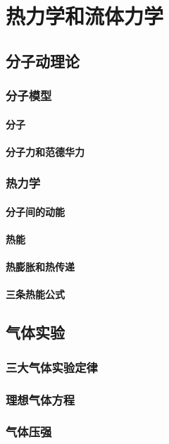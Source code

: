 \chapter{热力学和流体力学}
\section{分子动理论}
\subsection{分子模型}
\subsubsection{分子}
\subsubsection{分子力和范德华力}
\subsection{热力学}
\subsubsection{分子间的动能}
\subsubsection{热能}
\subsubsection{热膨胀和热传递}
\subsubsection{三条热能公式}
 
\section{气体实验}
\subsection{三大气体实验定律}
\subsection{理想气体方程}
\subsection{气体压强}

